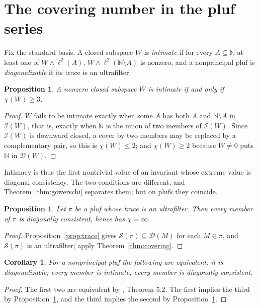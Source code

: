 \documentclass[11pt,reqno]{amsart}
\newtheorem{proposition}[theorem]{Proposition}
\newtheorem{corollary}[theorem]{Corollary}
\theoremstyle{definition}
\newcommand{\N}{\mathbb{N}}
\newcommand{\cD}{\mathcal{D}}
\newcommand{\cI}{\mathcal{I}}
\newcommand{\cS}{\mathcal{S}}
\newcommand{\pluf}{\pi}
\begin{document}
\section{The covering number in the pluf series}\label{sec:series}

Fix the standard basis. A closed subspace $W$ is \emph{intimate} \cite{FWII} if
for every $A\subseteq\N$ at least one of $W\wedge\ell^2(A)$,
$W\wedge\ell^2(\N\setminus A)$ is nonzero, and a nonprincipal pluf is
\emph{diagonalizable} if its trace is an ultrafilter.

\begin{proposition}\label{prop:intimatechi}
A nonzero closed subspace $W$ is intimate if and only if $\chi(W)\ge3$.
\end{proposition}

\begin{proof}
$W$ fails to be intimate exactly when some $A$ has both $A$ and
$\N\setminus A$ in $\cI(W)$, that is, exactly when $\N$ is the union of two
members of $\cI(W)$. Since $\cI(W)$ is downward closed, a cover by two members
may be replaced by a complementary pair, so this is $\chi(W)\le2$; and
$\chi(W)\ge2$ because $W\neq0$ puts $\N$ in $\cD(W)$.
\end{proof}

Intimacy is thus the first nontrivial value of an invariant whose extreme value
is diagonal consistency. The two conditions are different, and
Theorem~\ref{thm:gowerschi} separates them; but on plufs they coincide.

\begin{proposition}\label{prop:collapse}
Let $\pluf$ be a pluf whose trace is an ultrafilter. Then every member of
$\pluf$ is diagonally consistent, hence has $\chi=\infty$.
\end{proposition}

\begin{proof}
Proposition~\ref{prop:trace} gives $\cS(\pluf)\subseteq\cD(M)$ for each
$M\in\pluf$, and $\cS(\pluf)$ is an ultrafilter; apply
Theorem~\ref{thm:covering}.
\end{proof}

\begin{corollary}\label{cor:collapse}
For a nonprincipal pluf the following are equivalent: it is diagonalizable;
every member is intimate; every member is diagonally consistent.
\end{corollary}

\begin{proof}
The first two are equivalent by \cite{FWII}, Theorem 5.2. The first implies the
third by Proposition~\ref{prop:collapse}, and the third implies the second by
Proposition~\ref{prop:intimatechi}.
\end{proof}
\end{document}
